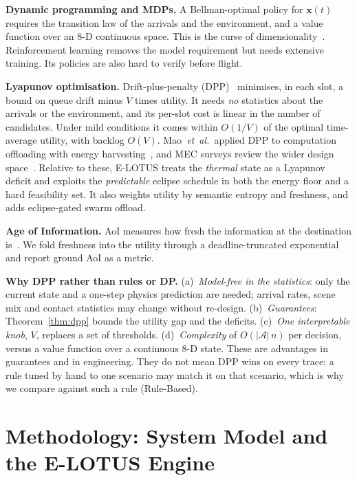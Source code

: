 \documentclass[conference]{IEEEtran}
\theoremstyle{remark}
\begin{document}
\textbf{Dynamic programming and MDPs.} A Bellman-optimal policy for $\mathbf{x}(t)$ requires the transition law of the arrivals and the environment, and a value function over an 8-D continuous space. This is the curse of dimensionality~\cite{bertsekas2017dp}. Reinforcement learning removes the model requirement but needs extensive training. Its policies are also hard to verify before flight.

\textbf{Lyapunov optimisation.} Drift-plus-penalty (DPP)~\cite{georgiadis2006resource,neely2010stochastic} minimises, in each slot, a bound on queue drift minus $V$ times utility. It needs \emph{no} statistics about the arrivals or the environment, and its per-slot cost is linear in the number of candidates. Under mild conditions it comes within $O(1/V)$ of the optimal time-average utility, with backlog $O(V)$. Mao~\textit{et~al.}\ applied DPP to computation offloading with energy harvesting~\cite{mao2016lodco}, and MEC surveys review the wider design space~\cite{mao2017mec}. Relative to these, E-LOTUS treats the \emph{thermal} state as a Lyapunov deficit and exploits the \emph{predictable} eclipse schedule in both the energy floor and a hard feasibility set. It also weights utility by semantic entropy and freshness, and adds eclipse-gated swarm offload.

\textbf{Age of Information.} AoI measures how fresh the information at the destination is~\cite{kaul2012aoi,yates2021aoi}. We fold freshness into the utility through a deadline-truncated exponential and report ground AoI as a metric.

\textbf{Why DPP rather than rules or DP.} (a)~\emph{Model-free in the statistics}: only the current state and a one-step physics prediction are needed; arrival rates, scene mix and contact statistics may change without re-design. (b)~\emph{Guarantees}: Theorem~\ref{thm:dpp} bounds the utility gap and the deficits. (c)~\emph{One interpretable knob}, $V$, replaces a set of thresholds. (d)~\emph{Complexity} of $O(|\mathcal A|\,n)$ per decision, versus a value function over a continuous 8-D state. These are advantages in guarantees and in engineering. They do not mean DPP wins on every trace: a rule tuned by hand to one scenario may match it on that scenario, which is why we compare against such a rule (Rule-Based).

\section{Methodology: System Model and the E-LOTUS Engine}\label{sec:method}
\end{document}
